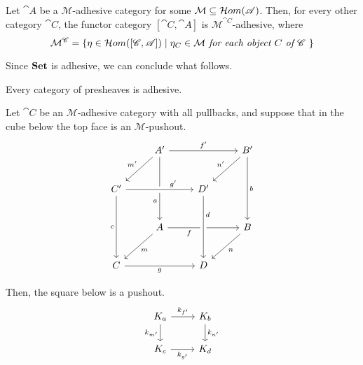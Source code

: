 \begin{cor}\label{cor:adhesivity_functor_categories}
    Let $\cat A$ be a $\mathcal M$-adhesive category for some $\mathcal M \subseteq \mathcal{H}om(\mathscr{A})$. Then, for every other category $\cat C$, the functor category $[\cat C, \cat A]$ is $\mathcal M^{\cat C}$-adhesive, where 
    \[
        \mathcal{M}^{\mathscr{C}} = \{\eta \in \mathcal{H}om([\mathscr{C}, \mathscr{A}]) \mid \eta_C \in \mathcal M \textit{ for each object $C$ of $\mathscr{C}$ }\}
    \]
\end{cor}

Since $\mathbf{Set}$ is adhesive, we can conclude what follows.

\begin{cor}\label{cor:presh_adhesive}
    Every category of presheaves is adhesive.
\end{cor}

\color{blue}


\begin{lemma}\label{lemma:pushouts_kernel_pairs}
	Let $\cat C$ be an  $\mathcal{M}$-adhesive category with all pullbacks, and suppose that in the cube below the top face is an $\mathcal{M}$-pushout.
	\[\begin{tikzcd}[row sep=25, column sep=25]
		& {A'} && {B'} \\
		{C'} && {D'} \\
		& A && B \\
		C && D
		\arrow["{f'}", from=1-2, to=1-4]
		\arrow["{m'}"', from=1-2, to=2-1]
		\arrow["a"'{pos=0.7}, from=1-2, to=3-2]
		\arrow["{n'}"', from=1-4, to=2-3]
		\arrow["b", from=1-4, to=3-4]
		\arrow["{g'}"{pos=0.7}, from=2-1, to=2-3, crossing over]
		\arrow["c"', from=2-1, to=4-1]
		\arrow["f"'{pos=0.3}, from=3-2, to=3-4]
		\arrow["d"{pos=0.3}, from=2-3, to=4-3, crossing over]
		\arrow["m", from=3-2, to=4-1]
		\arrow["n", from=3-4, to=4-3]
		\arrow["g"', from=4-1, to=4-3]
	\end{tikzcd}\]
	
	Then, the square below is a pushout.
	\[
	\begin{tikzcd}%
		{K_a} \ar[r, "{k_{f'}}"] \ar[d, "{k_{m'}}"'] & {K_b} \ar[d, "{k_{n'}}"] \\
		{K_c} \ar[r, "{k_{g'}}"'] & {K_d}
	\end{tikzcd}
	\]
\end{lemma}

